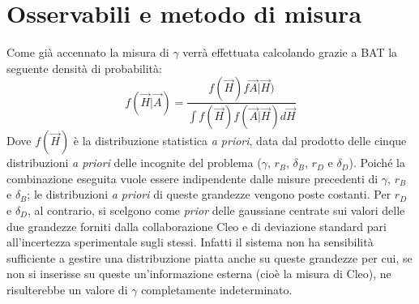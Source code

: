 \section{Osservabili e metodo di misura}
\noindent
Come già accennato la misura di $\gamma$ verrà effettuata calcolando grazie a BAT la seguente densità di probabilità:
\begin{equation}
   f(\vec{H}|\vec{A}) = \frac{f(\vec{H})f\vec{A}|\vec{H})}{\int f(\vec{H})f(\vec{A}|\vec{H})d\vec{H}}
\end{equation}
Dove $f(\vec{H})$ è la distribuzione statistica \emph{a priori}, data dal prodotto delle cinque distribuzioni \emph{a priori} delle incognite del problema ($\gamma$, $r_B$, $\delta_B$, $r_D$ e $\delta_D$).
Poiché la combinazione eseguita vuole essere indipendente dalle misure precedenti di $\gamma$, $r_B$ e $\delta_B$;
le distribuzioni \emph{a priori} di queste grandezze vengono poste costanti.
Per $r_D$ e $\delta_D$, al contrario, si scelgono come \emph{prior} delle gaussiane centrate sui valori 
delle due grandezze forniti dalla collaborazione Cleo e di deviazione standard pari all'incertezza sperimentale sugli stessi.
Infatti il sistema non ha sensibilità sufficiente a gestire una distribuzione piatta anche su queste grandezze per cui, se non si inserisse su queste un'informazione
esterna (cioè la misura di Cleo), ne risulterebbe un valore di $\gamma$ completamente indeterminato.

